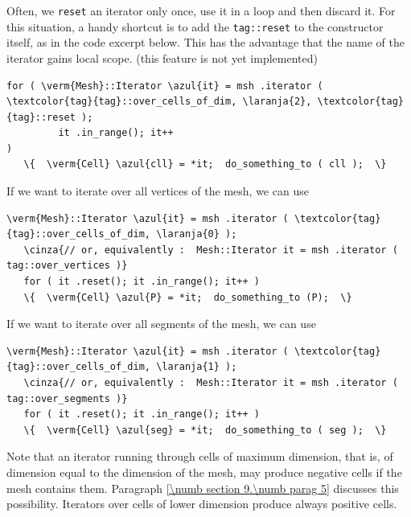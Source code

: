 Often, we {\small\tt reset} an iterator only once, use it in a loop and then discard it.
For this situation, a handy shortcut is to add the {\small\tt\textcolor{tag}{tag}::reset}
to the constructor itself, as in the code excerpt below.
This has the advantage that the name of the iterator gains local scope.
(this feature is not yet implemented)

\begin{Verbatim}[commandchars=\\\{\},formatcom=\small\tt,
   baselinestretch=0.94,framesep=2mm                      ]
   for ( \verm{Mesh}::Iterator \azul{it} = msh .iterator ( \textcolor{tag}{tag}::over_cells_of_dim, \laranja{2}, \textcolor{tag}{tag}::reset );
         it .in_range(); it++                                                        )
   \{  \verm{Cell} \azul{cll} = *it;  do_something_to ( cll );  \}
\end{Verbatim}

If we want to iterate over all vertices of the mesh, we can use

\begin{Verbatim}[commandchars=\\\{\},formatcom=\small\tt,
   baselinestretch=0.94,framesep=2mm                      ]
   \verm{Mesh}::Iterator \azul{it} = msh .iterator ( \textcolor{tag}{tag}::over_cells_of_dim, \laranja{0} );
   \cinza{// or, equivalently :  Mesh::Iterator it = msh .iterator ( tag::over_vertices )}
   for ( it .reset(); it .in_range(); it++ )
   \{  \verm{Cell} \azul{P} = *it;  do_something_to (P);  \}
\end{Verbatim}

If we want to iterate over all segments of the mesh, we can use

\begin{Verbatim}[commandchars=\\\{\},formatcom=\small\tt,
   baselinestretch=0.94,framesep=2mm                      ]
   \verm{Mesh}::Iterator \azul{it} = msh .iterator ( \textcolor{tag}{tag}::over_cells_of_dim, \laranja{1} );
   \cinza{// or, equivalently :  Mesh::Iterator it = msh .iterator ( tag::over_segments )}
   for ( it .reset(); it .in_range(); it++ )
   \{  \verm{Cell} \azul{seg} = *it;  do_something_to ( seg );  \}
\end{Verbatim}

Note that an iterator running through cells of maximum dimension, that is, of dimension equal
to the dimension of the mesh, may produce negative cells if the mesh contains them.
Paragraph \ref{\numb section 9.\numb parag 5} discusses this possibility.
Iterators over cells of lower dimension produce always positive cells.

